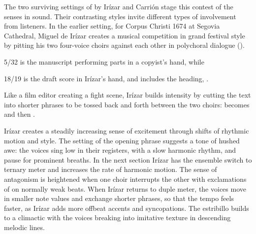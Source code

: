 The two surviving settings of  by Irízar and Carrión stage this contest of the senses in sound.
Their contrasting styles invite different types of involvement from listeners.
In the earlier setting, for Corpus Christi 1674 at Segovia Cathedral, Miguel de Irízar creates a musical competition in grand festival style by pitting his two four-voice choirs against each other in polychoral dialogue ().%
\begin{Footnote}
  \signature{E-SE}{5/32} is the manuscript performing parts in a copyist's hand, while \signature{E-SE}{18/19} is the draft score in Irízar's hand, and includes the heading, .
\end{Footnote}
Like a film editor creating a fight scene, Irízar builds intensity by cutting the text into shorter phrases to be tossed back and forth between the two choirs:  becomes  and then . 


Irízar creates a steadily increasing sense of excitement through shifts of rhythmic motion and style.
The setting of the opening phrase suggests a tone of hushed awe: the voices sing low in their registers, with a slow harmonic rhythm, and pause for prominent breaths.
In the next section Irízar has the ensemble switch to ternary meter and increases the rate of harmonic motion.
The sense of antagonism is heightened when one choir interrupts the other with exclamations of  on normally weak beats.
When Irízar returns to duple meter, the voices move in smaller note values and exchange shorter phrases, so that the tempo feels faster, as Irízar adds more offbeat accents and syncopations.
The estribillo builds to a climactic  with the voices breaking into imitative texture in descending melodic lines.

